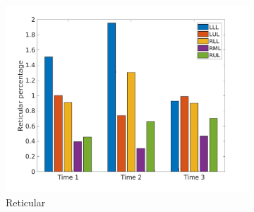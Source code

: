 \begin{figure}[H]
\begin{subfigure}{.46\linewidth}%
  \includegraphics[width=\linewidth,trim={{.0\wd0} {.0\wd0} {.0\wd0} {.0\wd0}},clip]{QuantitativeAnalysis/Image/IPF21ReticularLobarRegionDiseaseDistributionOverTime.jpg}
  \caption{Reticular}
  \label{fig:IPF21LobarRegionDiseaseDistributionOverTimeMain-b}
\end{subfigure}
\begin{subfigure}{.46\linewidth}%

\end{subfigure}
\end{figure}

